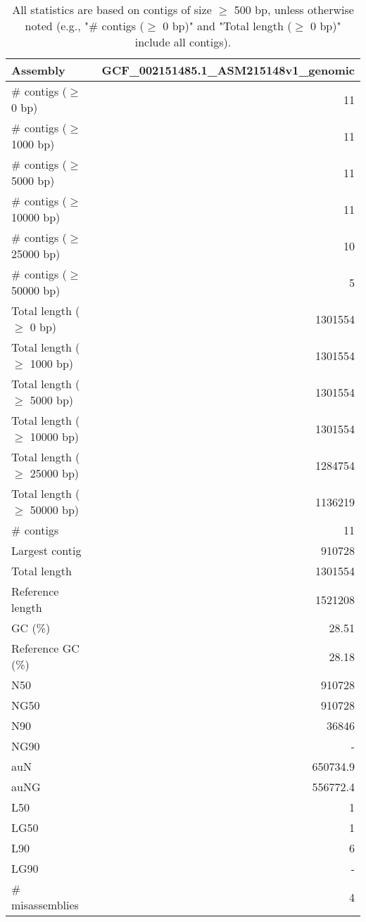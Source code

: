 \documentclass[12pt,a4paper]{article}
\begin{document}
\begin{table}[ht]
\begin{center}
\caption{All statistics are based on contigs of size $\geq$ 500 bp, unless otherwise noted (e.g., "\# contigs ($\geq$ 0 bp)" and "Total length ($\geq$ 0 bp)" include all contigs).}
\begin{tabular}{|l*{1}{|r}|}
\hline
Assembly & GCF\_002151485.1\_ASM215148v1\_genomic \\ \hline
\# contigs ($\geq$ 0 bp) & 11 \\ \hline
\# contigs ($\geq$ 1000 bp) & 11 \\ \hline
\# contigs ($\geq$ 5000 bp) & 11 \\ \hline
\# contigs ($\geq$ 10000 bp) & 11 \\ \hline
\# contigs ($\geq$ 25000 bp) & 10 \\ \hline
\# contigs ($\geq$ 50000 bp) & 5 \\ \hline
Total length ($\geq$ 0 bp) & 1301554 \\ \hline
Total length ($\geq$ 1000 bp) & 1301554 \\ \hline
Total length ($\geq$ 5000 bp) & 1301554 \\ \hline
Total length ($\geq$ 10000 bp) & 1301554 \\ \hline
Total length ($\geq$ 25000 bp) & 1284754 \\ \hline
Total length ($\geq$ 50000 bp) & 1136219 \\ \hline
\# contigs & 11 \\ \hline
Largest contig & 910728 \\ \hline
Total length & 1301554 \\ \hline
Reference length & 1521208 \\ \hline
GC (\%) & 28.51 \\ \hline
Reference GC (\%) & 28.18 \\ \hline
N50 & 910728 \\ \hline
NG50 & 910728 \\ \hline
N90 & 36846 \\ \hline
NG90 & - \\ \hline
auN & 650734.9 \\ \hline
auNG & 556772.4 \\ \hline
L50 & 1 \\ \hline
LG50 & 1 \\ \hline
L90 & 6 \\ \hline
LG90 & - \\ \hline
\# misassemblies & 4 \\ \hline

\end{tabular}
\end{center}
\end{table}
\end{document}
